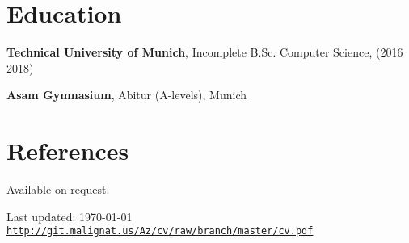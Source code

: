 \documentclass[a4paper]{article}
\def\footerlink{http://git.malignat.us/Az/cv/raw/branch/master/cv.pdf}
\renewenvironment{itemize}{
  \begin{list}{}{
    \setlength{\leftmargin}{1.5em}
  }
}{
  \end{list}
}
\begin{document}
\section*{Education}

\begin{itemize}
  \item \textbf{Technical University of Munich}, Incomplete B.Sc. Computer Science,  (2016
    {\textendash} 2018)
  \item \textbf{Asam Gymnasium}, Abitur (A-levels), Munich
\end{itemize}

\section*{References}
Available on request.

\vfill

\begin{center}
  \begin{footnotesize}
    Last updated: \today \\
    \href{\footerlink}{\texttt{\footerlink}}
  \end{footnotesize}
\end{center}
\end{document}
